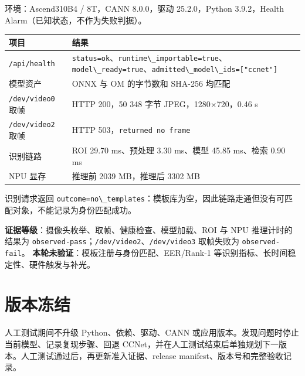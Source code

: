 环境：Ascend310B4 / 8T，CANN 8.0.0，驱动 25.2.0，Python 3.9.2，Health
Alarm（已知状态，不作为失败判据）。

\begin{longtable}[]{@{}
  >{\raggedright\arraybackslash}p{}
  >{\raggedright\arraybackslash}p{}@{}}
\toprule\noalign{}
\begin{minipage}[b]{\linewidth}\raggedright
项目
\end{minipage} & \begin{minipage}[b]{\linewidth}\raggedright
结果
\end{minipage} \\
\midrule\noalign{}
\endhead
\bottomrule\noalign{}
\endlastfoot
\passthrough{\lstinline!/api/health!} &
\passthrough{\lstinline!status=ok!}、\passthrough{\lstinline!runtime\_importable=true!}、\passthrough{\lstinline!model\_ready=true!}、\passthrough{\lstinline!admitted\_model\_ids=["ccnet"]!} \\
模型资产 & ONNX 与 OM 的字节数和 SHA-256 均匹配 \\
\passthrough{\lstinline!/dev/video0!} 取帧 & HTTP 200，50 348 字节
JPEG，1280×720，0.46 s \\
\passthrough{\lstinline!/dev/video2!} 取帧 & HTTP
503，\passthrough{\lstinline!returned no frame!} \\
识别链路 & ROI 29.70 ms、预处理 3.30 ms、模型 45.85 ms、检索 0.90 ms \\
NPU 显存 & 推理前 2039 MB，推理后 3302 MB \\
\end{longtable}

识别请求返回
\passthrough{\lstinline!outcome=no\_templates!}：模板库为空，因此链路走通但没有可匹配对象，不能记录为身份匹配成功。

\textbf{证据等级}：摄像头枚举、取帧、健康检查、模型加载、ROI 与 NPU
推理计时的结果为
\passthrough{\lstinline!observed-pass!}；\passthrough{\lstinline!/dev/video2!}、\passthrough{\lstinline!/dev/video3!}
取帧失败为 \passthrough{\lstinline!observed-fail!}。
\textbf{本轮未验证}：模板注册与身份匹配、EER/Rank-1
等识别指标、长时间稳定性、硬件触发与补光。

\section{版本冻结}\label{ux7248ux672cux51bbux7ed3}

人工测试期间不升级 Python、依赖、驱动、CANN
或应用版本。发现问题时停止当前模型、记录复现步骤、回退
CCNet，并在人工测试结束后单独规划下一版本。人工测试通过后，再更新准入证据、release
manifest、版本号和完整验收记录。

